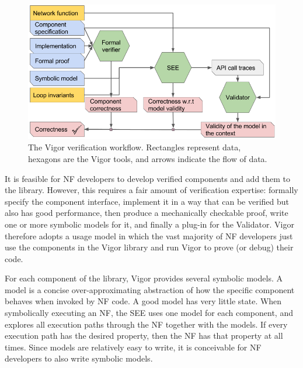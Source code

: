 \documentclass[letterpaper,twocolumn,10pt]{article}
\begin{document}
\begin{figure}[]
    \includegraphics[width=\columnwidth]{figures/vigor_algorithm.png}
    \caption{The Vigor verification workflow. Rectangles represent data, hexagons are the Vigor tools, and arrows indicate the flow of data.}
    \label{fig:algo}
\end{figure}

It is feasible for NF developers to develop verified components and add them to
the library. However, this requires a fair amount of verification expertise:
formally specify the component interface, implement it in a way that can be
verified but also has good performance, then produce a mechanically checkable
proof, write one or more symbolic models for it, and finally a plug-in for the
Validator. Vigor therefore adopts a usage model in which the vast majority of NF
developers just use the components in the Vigor library and run Vigor to prove
(or debug) their code.



For each component of the library, Vigor provides several symbolic models. A
model is a concise over-approximating abstraction of how the specific component
behaves when invoked by NF code. A good model has very little state. When
symbolically executing an NF, the SEE uses one model for each component, and
explores all execution paths through the NF together with the models. If every
execution path has the desired property, then the NF has that property at all
times. Since models are relatively easy to write, it is conceivable for NF
developers to also write symbolic models.
\end{document}
